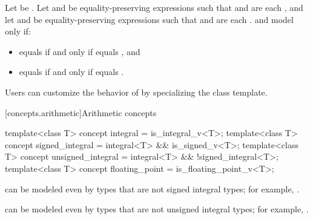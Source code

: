 \begin{itemdescr}
\pnum
Let  be .
Let  and  be
equality-preserving expressions such that
 and  are each , and
let  and  be equality-preserving expressions such that
 and  are each .
 and  model 
only if:
\begin{itemize}
\item {} equals  if and only if
   equals , and
\item {} equals  if and only if
   equals .
\end{itemize}

\pnum
\begin{note}
Users can customize the behavior of  by specializing the
 class template.
\end{note}

\end{itemdescr}

[concepts.arithmetic]{Arithmetic concepts}

%
%
%
\begin{itemdecl}
template<class T>
  concept integral = is_integral_v<T>;
template<class T>
  concept signed_integral = integral<T> && is_signed_v<T>;
template<class T>
  concept unsigned_integral = integral<T> && !signed_integral<T>;
template<class T>
  concept floating_point = is_floating_point_v<T>;
\end{itemdecl}

\begin{itemdescr}
\pnum
\begin{note}
 can be modeled even by types that are
not signed integral types; for example, .
\end{note}

\pnum
\begin{note}
 can be modeled even by types that are
not unsigned integral types; for example, .
\end{note}
\end{itemdescr}

